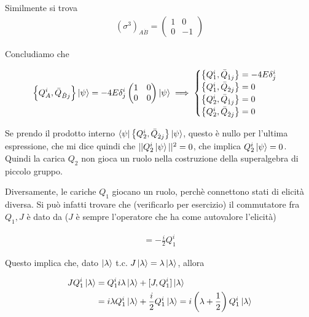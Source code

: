 \documentclass{report}
\begin{document}
Similmente si trova 
\begin{align}
    (\sigma^3)_{A\dot{B}}  = \begin{pmatrix}
        1 & 0 \\ 0 & -1
    \end{pmatrix}
\end{align}

Concludiamo che 

\begin{align}
    \left\{Q_A^i, \bar{Q}_{\dot{B}j} \right\}\ket{\psi} = -4E\delta^i_j \begin{pmatrix}
        1 & 0 \\ 0 & 0 
    \end{pmatrix} \ket{\psi} \implies \begin{cases}
        \left\{Q_1^i, \bar{Q}_{\dot{1}j} \right\} = -4E\delta^i_j \\
        \left\{Q_1^i, \bar{Q}_{\dot{2}j} \right\} = 0 \\
        \left\{Q_2^i, \bar{Q}_{\dot{1}j} \right\} = 0 \\
        \left\{Q_2^i, \bar{Q}_{\dot{2}j} \right\} = 0
    \end{cases}
\end{align}

Se prendo il prodotto interno \(\bra{\psi}\left\{Q_2^i, \bar{Q}_{\dot{2}j} \right\} \ket{\psi}\), questo è nullo per l'ultima espressione, che mi dice quindi che \(||Q_2^i\ket{\psi}||^2 = 0\), che implica \(Q_2^i \ket{\psi} = 0\). Quindi la carica \(Q_2\) non gioca un ruolo nella costruzione della superalgebra di piccolo gruppo. 

Diversamente, le cariche \(Q_1\) giocano un ruolo, perchè connettono stati di elicità diversa. Si può infatti trovare che (verificarlo per esercizio) il commutatore fra \(Q_1, J\) è dato da (\(J\) è sempre l'operatore che ha come autovalore l'elicità)

\begin{align}
    [Q^i_1, J] = -\frac{i}{2}Q^i_1  
\end{align}

Questo implica che, dato \(\ket{\lambda}\) t.c. \(J\ket{\lambda} = \lambda\ket{\lambda}\), allora

\begin{align}
    J Q_1^i \ket{\lambda} &= Q_1^i i\lambda \ket{\lambda} + [J, Q_1^i]\ket{\lambda} \notag \\ 
    &= i\lambda Q_1^i \ket{\lambda} + \frac{i}{2}Q_1^i \ket{\lambda} = i\left(\lambda + \frac{1}{2} \right)Q_1^i \ket{\lambda}
\end{align}
\end{document}
